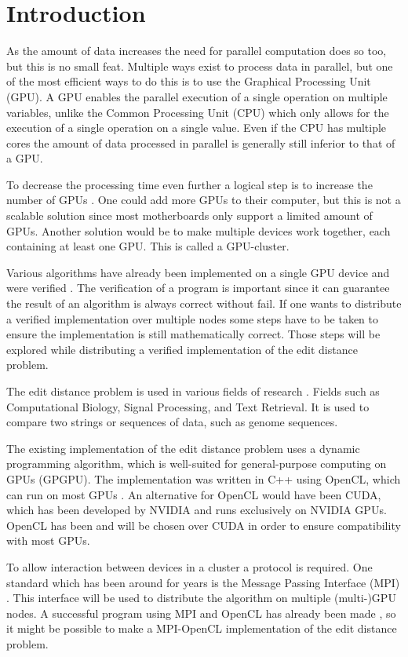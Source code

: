 \section{Introduction}
As the amount of data increases the need for parallel computation does so too, but this is no small feat.
Multiple ways exist to process data in parallel, but one of the most efficient ways to do this is to use the Graphical Processing Unit (GPU).
A GPU enables the parallel execution of a single operation on multiple variables, unlike the Common Processing Unit (CPU) which only allows for the execution of a single operation on a single value.
Even if the CPU has multiple cores the amount of data processed in parallel is generally still inferior to that of a GPU.

To decrease the processing time even further a logical step is to increase the number of GPUs \cite{Cluster}.
One could add more GPUs to their computer, but this is not a scalable solution since most motherboards only support a limited amount of GPUs.
Another solution would be to make multiple devices work together, each containing at least one GPU.
This is called a GPU-cluster.

Various algorithms have already been implemented on a single GPU device and were verified \cite{Heus:GPGPU}.
The verification of a program is important since it can guarantee the result of an algorithm is always correct without fail.
If one wants to distribute a verified implementation over multiple nodes some steps have to be taken to ensure the implementation is still mathematically correct.
Those steps will be explored while distributing a verified implementation of the edit distance problem.

The edit distance problem is used in various fields of research \cite{Navarro:2001:GTA:375360.375365}.
Fields such as Computational Biology, Signal Processing, and Text Retrieval.
It is used to compare two strings or sequences of data, such as genome sequences.

The existing implementation of the edit distance problem uses a dynamic programming algorithm, which is well-suited for general-purpose computing on GPUs (GPGPU).
The implementation was written in C++ using OpenCL, which can run on most GPUs \cite{Kronos:conformant}.
An alternative for OpenCL would have been CUDA, which has been developed by NVIDIA and runs exclusively on NVIDIA GPUs.
OpenCL has been and will be chosen over CUDA in order to ensure compatibility with most GPUs.

To allow interaction between devices in a cluster a protocol is required.
One standard which has been around for years is the Message Passing Interface (MPI) \cite{MPI}.
This interface will be used to distribute the algorithm on multiple (multi-)GPU nodes.
A successful program using MPI and OpenCL has already been made \cite{Cluster}, so it might be possible to make a MPI-OpenCL implementation of the edit distance problem.

